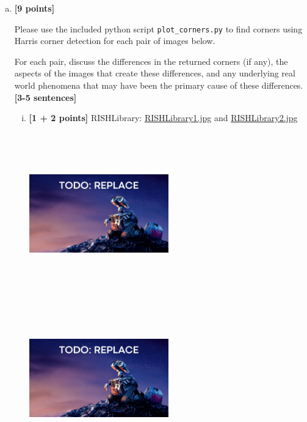 \documentclass[11pt]{article}
\begin{document}
\begin{enumerate}[(a)]
    \item \textbf{[9 points]}

    \begin{tcolorbox}[colback=orange!5!white,colframe=orange!75!black]
    Please use the included python script \texttt{plot\_corners.py} to find corners using Harris corner detection for each pair of images below. 

    For each pair, discuss the differences in the returned corners (if any), the aspects of the images that create these differences, and any underlying real world phenomena that may have been the primary cause of these differences. \textbf{[3-5 sentences]}
    \end{tcolorbox}

    \begin{enumerate}[(i)]
        \item \textbf{[1 + 2 points]}
        RISHLibrary: 
        \href{images/RISHLibrary1.jpg}{RISHLibrary1.jpg} and \href{images/RISHLibrary2.jpg}{RISHLibrary2.jpg} 
        \begin{tcolorbox}[colback=white!5!white,colframe=green!75!black,breakable]
        \includegraphics[width=0.5\textwidth,height=7cm,keepaspectratio]{images/TODO wall-e.jpg}
        \includegraphics[width=0.5\textwidth,height=7cm,keepaspectratio]{images/TODO wall-e.jpg}


\end{tcolorbox}
\end{enumerate}
\end{enumerate}
\end{document}
